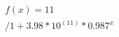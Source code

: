 \documentclass[preview]{standalone}
\begin{document}
\begin{align*}
f(x) = 11\\/1+3.98*10^(11)*0.987^x
\end{align*}
\end{document}
